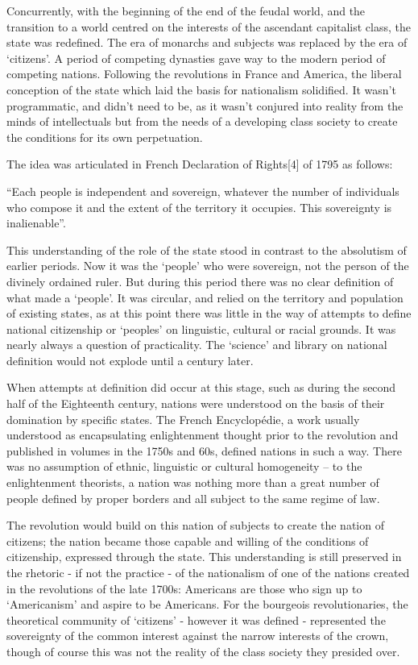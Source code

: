 Concurrently, with the beginning of the end of the feudal world, and the transition to a world centred on the interests of the ascendant capitalist class, the state was redefined. The era of monarchs and subjects was replaced by the era of ‘citizens’. A period of competing dynasties gave way to the modern period of competing nations. Following the revolutions in France and America, the liberal conception of the state which laid the basis for nationalism solidified. It wasn’t programmatic, and didn’t need to be, as it wasn’t conjured into reality from the minds of intellectuals but from the needs of a developing class society to create the conditions for its own perpetuation.

The idea was articulated in French Declaration of Rights[4] of 1795 as follows:

“Each people is independent and sovereign, whatever the number of individuals who compose it and the extent of the territory it occupies. This sovereignty is inalienable”.

This understanding of the role of the state stood in contrast to the absolutism of earlier periods. Now it was the ‘people’ who were sovereign, not the person of the divinely ordained ruler. But during this period there was no clear definition of what made a ‘people’. It was circular, and relied on the territory and population of existing states, as at this point there was little in the way of attempts to define national citizenship or ‘peoples’ on linguistic, cultural or racial grounds. It was nearly always a question of practicality. The ‘science’ and library on national definition would not explode until a century later.

When attempts at definition did occur at this stage, such as during the second half of the Eighteenth century, nations were understood on the basis of their domination by specific states. The French Encyclopédie, a work usually understood as encapsulating enlightenment thought prior to the revolution and published in volumes in the 1750s and 60s, defined nations in such a way. There was no assumption of ethnic, linguistic or cultural homogeneity – to the enlightenment theorists, a nation was nothing more than a great number of people defined by proper borders and all subject to the same regime of law.

The revolution would build on this nation of subjects to create the nation of citizens; the nation became those capable and willing of the conditions of citizenship, expressed through the state. This understanding is still preserved in the rhetoric - if not the practice - of the nationalism of one of the nations created in the revolutions of the late 1700s: Americans are those who sign up to ‘Americanism’ and aspire to be Americans. For the bourgeois revolutionaries, the theoretical community of ‘citizens’ - however it was defined - represented the sovereignty of the common interest against the narrow interests of the crown, though of course this was not the reality of the class society they presided over.

